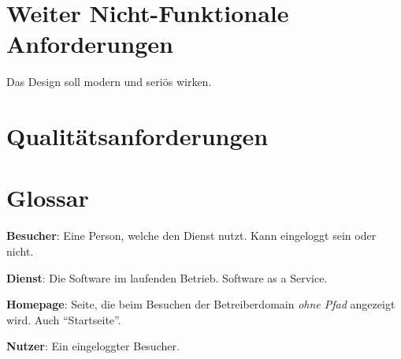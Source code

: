 \documentclass[parskip=full,11pt,twoside]{scrartcl}
\begin{document}
\section{Weiter Nicht-Funktionale Anforderungen}


Das Design soll modern und seriös wirken.


\section{Qualitätsanforderungen}



\section{Glossar}

\textbf{Besucher}:
Eine Person, welche den Dienst nutzt.
Kann eingeloggt sein oder nicht.

\textbf{Dienst}:
Die Software im laufenden Betrieb. Software as a Service.

\textbf{Homepage}:
Seite, die beim Besuchen der Betreiberdomain \emph{ohne Pfad} angezeigt wird. Auch \enquote{Startseite}.

\textbf{Nutzer}:
Ein eingeloggter Besucher.
\end{document}
